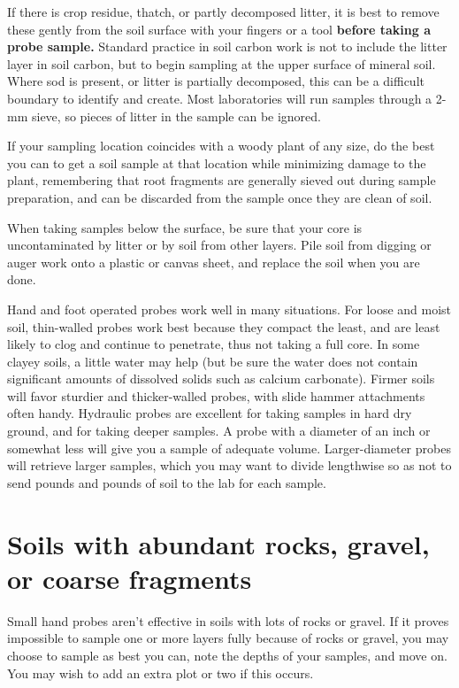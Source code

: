 \documentclass[11pt,letterpaper,oneside,onecolumn]{memoir}
\begin{document}
If there is crop residue, thatch, or partly decomposed litter, it is best to remove these gently from the soil surface with your fingers or a tool \textbf{before taking a probe sample.} Standard practice in soil carbon work is not to include the litter layer in soil carbon, but to begin sampling at the upper surface of mineral soil. Where sod is present, or litter is partially decomposed, this can be a difficult boundary to identify and create. Most laboratories will run samples through a 2-mm sieve, so pieces of litter in the sample can be ignored.

If your sampling location coincides with a woody plant of any size, do the best you can to get a soil sample at that location while minimizing damage to the plant, remembering that root fragments are generally sieved out during sample preparation, and can be discarded from the sample once they are clean of soil.

When taking samples below the surface, be sure that your core is uncontaminated by litter or by soil from other layers. Pile soil from digging or auger work onto a plastic or canvas sheet, and replace the soil when you are done.

Hand and foot operated probes work well in many situations. For loose and moist soil, thin-walled probes work best because they compact the least, and are least likely to clog and continue to penetrate, thus not taking a full core. In some clayey soils, a little water may help (but be sure the water does not contain significant amounts of dissolved solids such as calcium carbonate). Firmer soils will favor sturdier and thicker-walled probes, with slide hammer attachments often handy. Hydraulic probes are excellent for taking samples in hard dry ground, and for taking deeper samples. A probe with a diameter of an inch or somewhat less will give you a sample of adequate volume. Larger-diameter probes will retrieve larger samples, which you may want to divide lengthwise so as not to send pounds and pounds of soil to the lab for each sample.

\section{Soils with abundant rocks, gravel, or coarse fragments}

Small hand probes aren't effective in soils with lots of rocks or gravel. If it proves impossible to sample one or more layers fully because of rocks or gravel, you may choose to sample as best you can, note the depths of your samples, and move on. You may wish to add an extra plot or two if this occurs.
\end{document}
